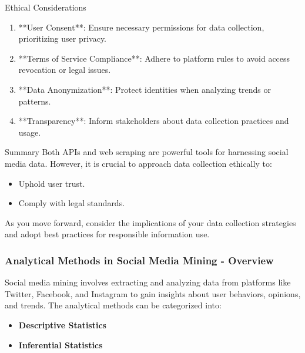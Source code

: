 \documentclass{beamer}
\begin{document}
\begin{frame}{Ethical Considerations}
    \begin{enumerate}
        \item **User Consent**: Ensure necessary permissions for data collection, prioritizing user privacy.
        \item **Terms of Service Compliance**: Adhere to platform rules to avoid access revocation or legal issues.
        \item **Data Anonymization**: Protect identities when analyzing trends or patterns.
        \item **Transparency**: Inform stakeholders about data collection practices and usage.
    \end{enumerate}
\end{frame}

\begin{frame}{Summary}
    Both APIs and web scraping are powerful tools for harnessing social media data.  
    However, it is crucial to approach data collection ethically to:
    \begin{itemize}
        \item Uphold user trust.
        \item Comply with legal standards.
    \end{itemize}
    As you move forward, consider the implications of your data collection strategies and adopt best practices for responsible information use.
\end{frame}

\begin{frame}[fragile]
    \frametitle{Analytical Methods in Social Media Mining - Overview}
    Social media mining involves extracting and analyzing data from platforms like Twitter, Facebook, and Instagram to gain insights about user behaviors, opinions, and trends. 
    The analytical methods can be categorized into:
    \begin{itemize}
        \item \textbf{Descriptive Statistics}
        \item \textbf{Inferential Statistics}
    \end{itemize}
\end{frame}
\end{document}
